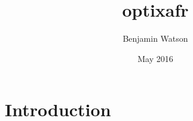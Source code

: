 \documentclass{article}
\title{optixafr}
\author{Benjamin Watson}
\date{May 2016}
\begin{document}
\maketitle

\section{Introduction}
\end{document}
